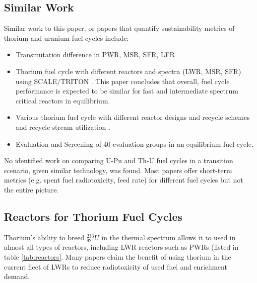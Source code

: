 \documentclass{article}
\newcommand{\uthree}{\xspace $^{233}_{92}U$ \xspace}
\begin{document}
\subsection{Similar Work}
Similar work to this paper, or papers that quantify
sustainability metrics of thorium and uranium fuel cycles include:
\begin{itemize}
\item Transmutation difference in \gls{PWR}, \gls{MSR}, \gls{SFR}, \gls{LFR} \cite{becker_transmutation_2007}
    \item Thorium fuel cycle with different reactors and spectra (\gls{LWR}, \gls{MSR}, \gls{SFR}) using SCALE/TRITON \cite{brown_sustainable_2015}. This paper concludes that overall, fuel cycle performance is expected to be similar for fast and intermediate spectrum critical reactors in equilibrium.
    \item Various thorium fuel cycle with different reactor designs and recycle schemes and recycle stream utilization \cite{taiwo_thorium_2016} \cite{krahn_-ne0000735_2017}.
    \item Evaluation and Screening of 40 evaluation groups \cite{wigeland_nuclear_2014} in an equilibrium fuel cycle.
\end{itemize}

No identified work on comparing U-Pu and Th-U fuel cycles
in a transition scenario, given similar technology, was found. Most papers
offer short-term metrics (e.g. spent fuel radiotoxicity, feed rate) 
for different fuel cycles but not the entire picture.

\subsection{Reactors for Thorium Fuel Cycles}

Thorium's ability to breed \uthree in the thermal spectrum allows
it to used in almost all types of reactors, including \gls{LWR} reactors
such as \glspl{PWR} (listed in table \ref{tab:reactors}.
 Many papers claim the benefit of using thorium
in the current fleet of \glspl{LWR} to reduce radiotoxicity of used fuel
and enrichment demand.
\end{document}
